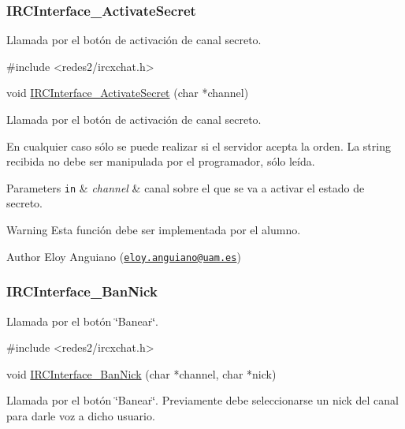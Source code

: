  \hypertarget{IRCInterface_ActivateSecret}{}\subsubsection{I\+R\+C\+Interface\+\_\+\+Activate\+Secret}\label{IRCInterface_ActivateSecret}
Llamada por el botón de activación de canal secreto.


\begin{DoxyCode}
\textcolor{preprocessor}{#include <redes2/ircxchat.h>}

\textcolor{keywordtype}{void} \hyperlink{xchat2_8c_aa9e9155115b834d85a4d10cb27f99093}{IRCInterface\_ActivateSecret} (\textcolor{keywordtype}{char} *channel)
\end{DoxyCode}


Llamada por el botón de activación de canal secreto.

En cualquier caso sólo se puede realizar si el servidor acepta la orden. La string recibida no debe ser manipulada por el programador, sólo leída.


\begin{DoxyParams}[1]{Parameters}
\mbox{\tt in}  & {\em channel} & canal sobre el que se va a activar el estado de secreto.\\
\hline
\end{DoxyParams}
\begin{DoxyWarning}{Warning}
Esta función debe ser implementada por el alumno.
\end{DoxyWarning}
\begin{DoxyAuthor}{Author}
Eloy Anguiano (\href{mailto:eloy.anguiano@uam.es}{\tt eloy.\+anguiano@uam.\+es})
\end{DoxyAuthor}


 \hypertarget{IRCInterface_BanNick}{}\subsubsection{I\+R\+C\+Interface\+\_\+\+Ban\+Nick}\label{IRCInterface_BanNick}
Llamada por el botón \char`\"{}\+Banear\char`\"{}.


\begin{DoxyCode}
\textcolor{preprocessor}{#include <redes2/ircxchat.h>}

\textcolor{keywordtype}{void} \hyperlink{xchat2_8c_a42773b5a840f9d0455f148d285e1e595}{IRCInterface\_BanNick} (\textcolor{keywordtype}{char} *channel, \textcolor{keywordtype}{char} *nick)
\end{DoxyCode}


Llamada por el botón \char`\"{}\+Banear\char`\"{}. Previamente debe seleccionarse un nick del canal para darle voz a dicho usuario.

